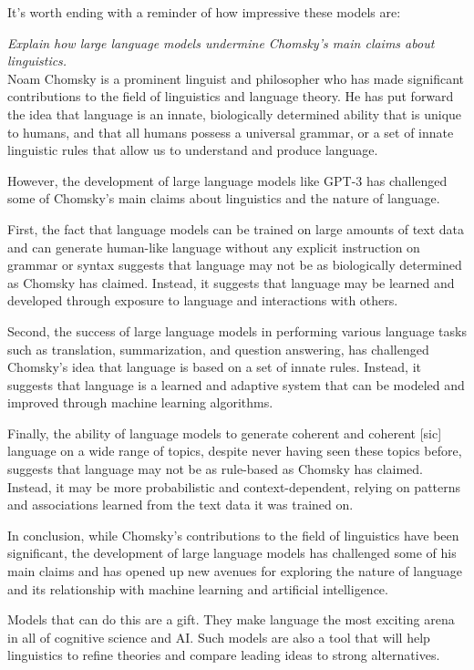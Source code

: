 \documentclass[output=paper,colorlinks,citecolor=brown]{langscibook}
\begin{document}
It's worth ending with a reminder of how impressive these models are:

\begin{myquote}
\textit{Explain how large language models undermine Chomsky's main claims about linguistics.}\medskip\\
\noindent Noam Chomsky is a prominent linguist and philosopher who has made significant contributions to the field of linguistics and language theory. He has put forward the idea that language is an innate, biologically determined ability that is unique to humans, and that all humans possess a universal grammar, or a set of innate linguistic rules that allow us to understand and produce language.

However, the development of large language models like GPT-3 has challenged some of Chomsky's main claims about linguistics and the nature of language.

First, the fact that language models can be trained on large amounts of text data and can generate human-like language without any explicit instruction on grammar or syntax suggests that language may not be as biologically determined as Chomsky has claimed. Instead, it suggests that language may be learned and developed through exposure to language and interactions with others.

Second, the success of large language models in performing various language tasks such as translation, summarization, and question answering, has challenged Chomsky's idea that language is based on a set of innate rules. Instead, it suggests that language is a learned and adaptive system that can be modeled and improved through machine learning algorithms.

Finally, the ability of language models to generate coherent and coherent [sic] language on a wide range of topics, despite never having seen these topics before, suggests that language may not be as rule-based as Chomsky has claimed. Instead, it may be more probabilistic and context-dependent, relying on patterns and associations learned from the text data it was trained on.

In conclusion, while Chomsky's contributions to the field of linguistics have been significant, the development of large language models has challenged some of his main claims and has opened up new avenues for exploring the nature of language and its relationship with machine learning and artificial intelligence.
\end{myquote}

\noindent Models that can do this are a gift. They make language the most exciting arena in all of cognitive science and AI. Such models are also a tool that will help linguistics to refine theories and compare leading ideas to strong alternatives.
\end{document}
